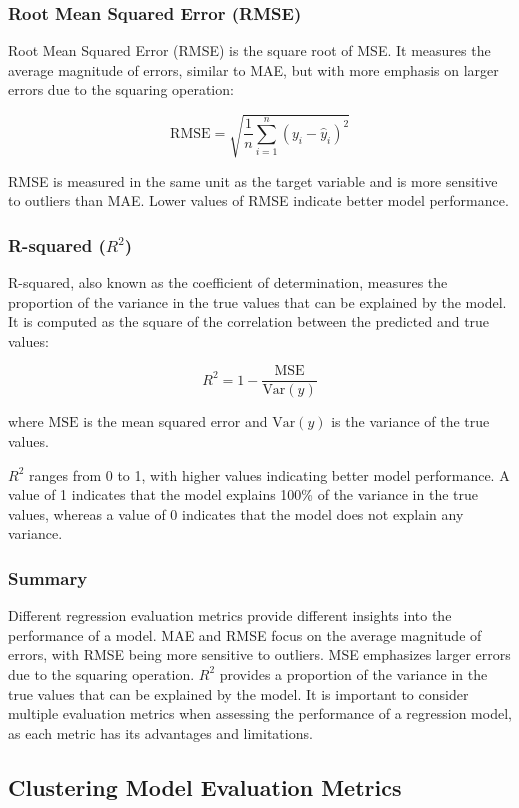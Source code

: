 \documentclass[12pt]{article}
\begin{document}
\subsubsection{Root Mean Squared Error (RMSE)}

Root Mean Squared Error (RMSE) is the square root of MSE. It measures the average magnitude of errors, similar to MAE, but with more emphasis on larger errors due to the squaring operation:

$$ \text{RMSE} = \sqrt{\frac{1}{n} \sum_{i=1}^{n} (y_i - \hat{y}_i)^2} $$

RMSE is measured in the same unit as the target variable and is more sensitive to outliers than MAE. Lower values of RMSE indicate better model performance.

\subsubsection{R-squared ($R^2$)}

R-squared, also known as the coefficient of determination, measures the proportion of the variance in the true values that can be explained by the model. It is computed as the square of the correlation between the predicted and true values:

$$ R^2 = 1 - \frac{\text{MSE}}{\text{Var}(y)} $$

where $\text{MSE}$ is the mean squared error and $\text{Var}(y)$ is the variance of the true values.

$R^2$ ranges from 0 to 1, with higher values indicating better model performance. A value of 1 indicates that the model explains 100\% of the variance in the true values, whereas a value of 0 indicates that the model does not explain any variance.

\subsubsection{Summary}

Different regression evaluation metrics provide different insights into the performance of a model. MAE and RMSE focus on the average magnitude of errors, with RMSE being more sensitive to outliers. MSE emphasizes larger errors due to the squaring operation. $R^2$ provides a proportion of the variance in the true values that can be explained by the model. It is important to consider multiple evaluation metrics when assessing the performance of a regression model, as each metric has its advantages and limitations.
\subsection{Clustering Model Evaluation Metrics}
\end{document}
